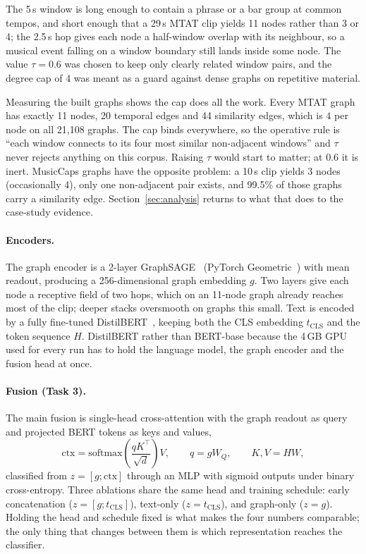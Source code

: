 \documentclass{article}
\begin{document}
The 5\,s window is long enough to contain a phrase or a bar group at common tempos, and short enough that a 29\,s
MTAT clip yields 11 nodes rather than 3 or 4; the 2.5\,s hop gives each node a
half-window overlap with its neighbour, so a musical event falling on a window
boundary still lands inside some node. The value $\tau{=}0.6$ was chosen to keep
only clearly related window pairs, and the degree cap of 4 was meant as a guard
against dense graphs on repetitive material.

Measuring the built graphs shows the cap does all the work. Every MTAT graph has
exactly 11 nodes, 20 temporal edges and 44 similarity edges, which is $4$ per
node on all 21{,}108 graphs. The cap binds everywhere, so the operative rule is
``each window connects to its four most similar non-adjacent windows'' and
$\tau$ never rejects anything on this corpus. Raising $\tau$ would start to
matter; at $0.6$ it is inert. MusicCaps graphs have the opposite problem: a
10\,s clip yields 3 nodes (occasionally 4), only one non-adjacent pair exists,
and 99.5\% of those graphs carry a similarity edge. Section~\ref{sec:analysis}
returns to what that does to the case-study evidence.

\paragraph{Encoders.}
The graph encoder is a 2-layer GraphSAGE~\cite{hamilton2017graphsage} (PyTorch
Geometric~\cite{fey2019pyg}) with mean readout, producing a 256-dimensional
graph embedding $g$. Two layers give each node a receptive field of two hops,
which on an 11-node graph already reaches most of the clip; deeper stacks
oversmooth on graphs this small. Text is encoded by a fully fine-tuned
DistilBERT~\cite{sanh2019distilbert,devlin2019bert}, keeping both the CLS
embedding $t_{\text{CLS}}$ and the token sequence $H$. DistilBERT rather than
BERT-base because the 4\,GB GPU used for every run has to hold the language
model, the graph encoder and the fusion head at once.

\paragraph{Fusion (Task 3).}
The main fusion is single-head cross-attention with the graph readout as query
and projected BERT tokens as keys and values,
\begin{equation}
  \mathrm{ctx}=\mathrm{softmax}\!\left(\frac{qK^\top}{\sqrt{d}}\right)V,
  \qquad q = gW_Q, \qquad K,V = HW,
\end{equation}
classified from $z=[g;\mathrm{ctx}]$ through an MLP with sigmoid outputs under
binary cross-entropy. Three ablations share the same head and training
schedule: early concatenation ($z=[g;t_{\text{CLS}}]$), text-only
($z=t_{\text{CLS}}$), and graph-only ($z=g$). Holding the head and schedule
fixed is what makes the four numbers comparable; the only thing that changes
between them is which representation reaches the classifier.
\end{document}
